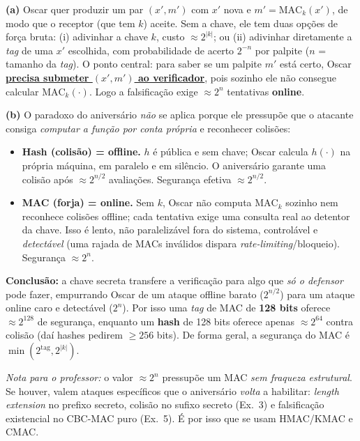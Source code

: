 \documentclass[11pt,a4paper]{article}
\newcommand{\alert}[1]{\textbf{\uline{#1}}}
\newenvironment{resposta}{%
    \begin{respostabox}
    \color{red!70!black}\sloppy
}{%
    \end{respostabox}
}
\begin{document}
\begin{resposta}
\textbf{(a)} Oscar quer produzir um par $(x', m')$ com $x'$ nova e $m' = \text{MAC}_k(x')$, de modo que o receptor (que tem $k$) aceite. Sem a chave, ele tem duas op\c{c}\~{o}es de for\c{c}a bruta: (i) adivinhar a chave $k$, custo $\approx 2^{|k|}$; ou (ii) adivinhar diretamente a \textit{tag} de uma $x'$ escolhida, com probabilidade de acerto $2^{-n}$ por palpite ($n$ = tamanho da \textit{tag}). O ponto central: para saber se um palpite $m'$ est\'{a} certo, Oscar \alert{precisa submeter $(x', m')$ ao verificador}, pois sozinho ele n\~{a}o consegue calcular $\text{MAC}_k(\cdot)$. Logo a falsifica\c{c}\~{a}o exige $\approx 2^{n}$ tentativas \textbf{online}.

\textbf{(b)} O paradoxo do anivers\'{a}rio \emph{n\~{a}o} se aplica porque ele pressup\~{o}e que o atacante consiga \emph{computar a fun\c{c}\~{a}o por conta pr\'{o}pria} e reconhecer colis\~{o}es:
\begin{itemize}
    \item \textbf{Hash (colis\~{a}o) = offline.} $h$ \'{e} p\'{u}blica e sem chave; Oscar calcula $h(\cdot)$ na pr\'{o}pria m\'{a}quina, em paralelo e em sil\^{e}ncio. O anivers\'{a}rio garante uma colis\~{a}o ap\'{o}s $\approx 2^{n/2}$ avalia\c{c}\~{o}es. Seguran\c{c}a efetiva $\approx 2^{n/2}$.
    \item \textbf{MAC (forja) = online.} Sem $k$, Oscar n\~{a}o computa $\text{MAC}_k$ sozinho nem reconhece colis\~{o}es offline; cada tentativa exige uma consulta real ao detentor da chave. Isso \'{e} lento, n\~{a}o paraleliz\'{a}vel fora do sistema, control\'{a}vel e \emph{detect\'{a}vel} (uma rajada de MACs inv\'{a}lidos dispara \textit{rate-limiting}/bloqueio). Seguran\c{c}a $\approx 2^{n}$.
\end{itemize}
\textbf{Conclus\~{a}o:} a chave secreta transfere a verifica\c{c}\~{a}o para algo que \emph{s\'{o} o defensor} pode fazer, empurrando Oscar de um ataque offline barato ($2^{n/2}$) para um ataque online caro e detect\'{a}vel ($2^{n}$). Por isso uma \textit{tag} de MAC de \textbf{128 bits} oferece $\approx 2^{128}$ de seguran\c{c}a, enquanto um \textbf{hash} de 128 bits oferece apenas $\approx 2^{64}$ contra colis\~{a}o (da\'{i} hashes pedirem $\geq 256$ bits). De forma geral, a seguran\c{c}a do MAC \'{e} $\min(2^{\text{tag}}, 2^{|k|})$.

{\footnotesize\textit{Nota para o professor:} o valor $\approx 2^{n}$ pressup\~{o}e um MAC \emph{sem fraqueza estrutural}. Se houver, valem ataques espec\'{i}ficos que o anivers\'{a}rio \emph{volta} a habilitar: \textit{length extension} no prefixo secreto, colis\~{a}o no sufixo secreto (Ex.~3) e falsifica\c{c}\~{a}o existencial no CBC-MAC puro (Ex.~5). \'{E} por isso que se usam HMAC/KMAC e CMAC.}
\end{resposta}
\end{document}
